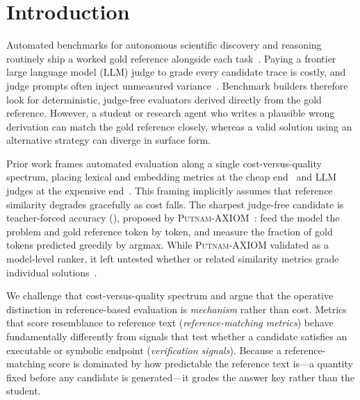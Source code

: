 \section{Introduction}
\label{sec:intro}

Automated benchmarks for autonomous scientific discovery and reasoning routinely ship a worked gold reference alongside each task~\citep{hendrycks2021math,cobbe2021gsm8k,chen2021codex}.
Paying a frontier large language model (LLM) judge to grade every candidate trace is costly, and judge prompts often inject unmeasured variance~\citep{zheng2023judging,tan2024judgebench}.
Benchmark builders therefore look for deterministic, judge-free evaluators derived directly from the gold reference.
However, a student or research agent who writes a plausible wrong derivation can match the gold reference closely, whereas a valid solution using an alternative strategy can diverge in surface form.

Prior work frames automated evaluation along a single cost-versus-quality spectrum, placing lexical and embedding metrics at the cheap end~\citep{yuan2021bartscore} and LLM judges at the expensive end~\citep{liu2023geval,zheng2023judging}.
This framing implicitly assumes that reference similarity degrades gracefully as cost falls.
The sharpest judge-free candidate is teacher-forced accuracy (\tfa), proposed by \textsc{Putnam-AXIOM}~\citep{gulati2025putnam}: feed the model the problem and gold reference token by token, and measure the fraction of gold tokens predicted greedily by argmax.
While \textsc{Putnam-AXIOM} validated \tfa{} as a model-level ranker, it left untested whether \tfa{} or related similarity metrics grade individual solutions~\citep{gulati2025putnam}.

We challenge that cost-versus-quality spectrum and argue that the operative distinction in reference-based evaluation is \emph{mechanism} rather than cost.
Metrics that score resemblance to reference text (\emph{reference-matching metrics}) behave fundamentally differently from signals that test whether a candidate satisfies an executable or symbolic endpoint (\emph{verification signals}).
Because a reference-matching score is dominated by how predictable the reference text is---a quantity fixed before any candidate is generated---it grades the answer key rather than the student.

